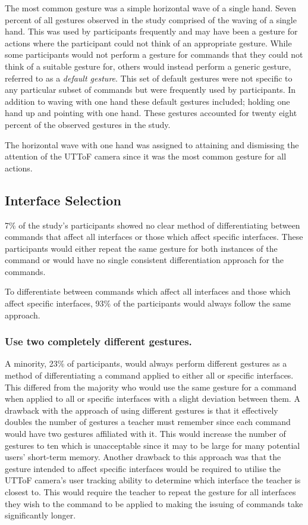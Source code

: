 \documentclass[manuscript, review, screen]{acmart}
\begin{document}
The most common gesture was a simple horizontal wave of a single hand.
Seven percent of all gestures observed in the study comprised of the waving of a single hand.
This was used by participants frequently and may have been a gesture for actions where the participant could not think of an appropriate gesture. 
While some participants would not perform a gesture for commands that they could not think of a suitable gesture for, others would instead perform a generic gesture, referred to as a \textit{default gesture}.
This set of default gestures were not specific to any particular subset of commands but were frequently used by participants.
In addition to waving with one hand these default gestures included; holding one hand up and pointing with one hand.
These gestures accounted for twenty eight percent of the observed gestures in the study.

The horizontal wave with one hand was assigned to attaining and dismissing the attention of the \ac{UTToF} camera since it was the most common gesture for all actions.

\subsection{Interface Selection}

7\% of the study's participants showed no clear method of differentiating between commands that affect all interfaces or those which affect specific interfaces. 
These participants would either repeat the same gesture for both instances of the command or would have no single consistent differentiation approach for the commands. 

To differentiate between commands which affect all interfaces and those which affect specific interfaces, 93\% of the participants would always follow the same approach.

\subsubsection{Use two completely different gestures.}

A minority, 23\% of participants, would always perform different gestures as a method of differentiating a command applied to either all or specific interfaces.
This differed from the majority who would use the same gesture for a command when applied to all or specific interfaces with a slight deviation between them.
A drawback with the approach of using different gestures is that it effectively doubles the number of gestures a teacher must remember since each command would have two gestures affiliated with it.
This would increase the number of gestures to ten which is unacceptable since it may to be large for many potential users' short-term memory.
Another drawback to this approach was that the gesture intended to affect specific interfaces would be required to utilise the \ac{UTToF} camera's user tracking ability to determine which interface the teacher is closest to.
This would require the teacher to repeat the gesture for all interfaces they wish to the command to be applied to making the issuing of commands take significantly longer.
\end{document}
